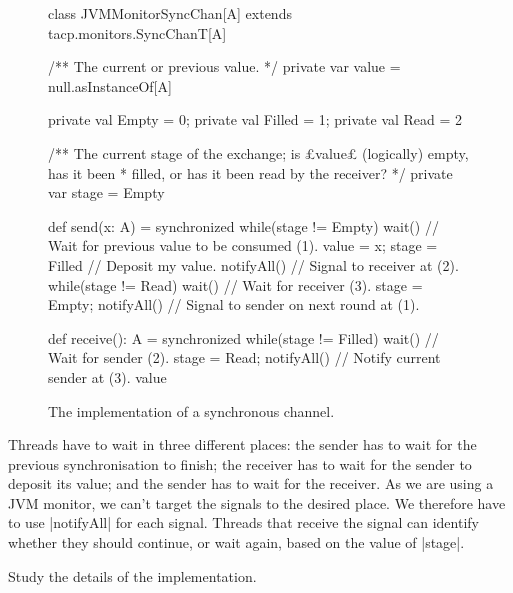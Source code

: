 
\begin{figure}
\begin{scala}
class JVMMonitorSyncChan[A] extends tacp.monitors.SyncChanT[A]{
  /** The current or previous value. */
  private var value = null.asInstanceOf[A]

  private val Empty = 0; private val Filled = 1; private val Read = 2

  /** The current stage of the exchange; is £value£ (logically) empty, has it been
    * filled, or has it been read by the receiver? */
  private var stage = Empty

  def send(x: A) = synchronized{
    while(stage != Empty) wait() // Wait for previous value to be consumed (1).
    value = x; stage = Filled   // Deposit my value.
    notifyAll() // Signal to receiver at (2).
    while(stage != Read) wait() // Wait for receiver (3).
    stage = Empty; notifyAll() // Signal to sender on next round at (1).
  }

  def receive(): A = synchronized{
    while(stage != Filled) wait() // Wait for sender (2).
    stage = Read; notifyAll()     // Notify current sender at (3).
    value
  }
}
\end{scala}
\caption{The implementation of a synchronous channel.}
\label{fig:JVM-SyncChan}
\end{figure}


Threads have to wait in three different places: the sender has to wait for the
previous synchronisation to finish; the receiver has to wait for the sender to
deposit its value; and the sender has to wait for the receiver.  As we are
using a JVM monitor, we can't target the signals to the desired place.  We
therefore have to use |notifyAll| for each signal.  Threads that receive the
signal can identify whether they should continue, or wait again, based on the
value of |stage|.

\begin{instruction}
Study the details of the implementation.
\end{instruction}
